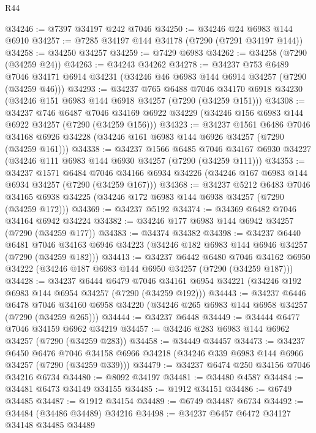 \begin{lexlean}{R44}
\begin{coremodule}
{@34246 := @7397 @34197 @242 @7046
@34250 := @34246 @24 @6983 @144 @6910
@34257 := @7285 @34197 @144 @34178 (@7290 (@7291 @34197 @144))
@34258 := @34250 @34257
@34259 := @7429 @6983
@34262 := @34258 (@7290 (@34259 @24))
@34263 := @34243 @34262
@34278 := @34237
    @753
    @6489
    @7046
    @34171
    @6914
    @34231
    (@34246 @46 @6983 @144 @6914 @34257 (@7290 (@34259 @46)))
@34293 := @34237
    @765
    @6488
    @7046
    @34170
    @6918
    @34230
    (@34246 @151 @6983 @144 @6918 @34257 (@7290 (@34259 @151)))
@34308 := @34237
    @746
    @6487
    @7046
    @34169
    @6922
    @34229
    (@34246 @156 @6983 @144 @6922 @34257 (@7290 (@34259 @156)))
@34323 := @34237
    @1561
    @6486
    @7046
    @34168
    @6926
    @34228
    (@34246 @161 @6983 @144 @6926 @34257 (@7290 (@34259 @161)))
@34338 := @34237
    @1566
    @6485
    @7046
    @34167
    @6930
    @34227
    (@34246 @111 @6983 @144 @6930 @34257 (@7290 (@34259 @111)))
@34353 := @34237
    @1571
    @6484
    @7046
    @34166
    @6934
    @34226
    (@34246 @167 @6983 @144 @6934 @34257 (@7290 (@34259 @167)))
@34368 := @34237
    @5212
    @6483
    @7046
    @34165
    @6938
    @34225
    (@34246 @172 @6983 @144 @6938 @34257 (@7290 (@34259 @172)))
@34369 := @34237 @5192
@34374 := @34369 @6482 @7046 @34164 @6942 @34224
@34382 := @34246 @177 @6983 @144 @6942 @34257 (@7290 (@34259 @177))
@34383 := @34374 @34382
@34398 := @34237
    @6440
    @6481
    @7046
    @34163
    @6946
    @34223
    (@34246 @182 @6983 @144 @6946 @34257 (@7290 (@34259 @182)))
@34413 := @34237
    @6442
    @6480
    @7046
    @34162
    @6950
    @34222
    (@34246 @187 @6983 @144 @6950 @34257 (@7290 (@34259 @187)))
@34428 := @34237
    @6444
    @6479
    @7046
    @34161
    @6954
    @34221
    (@34246 @192 @6983 @144 @6954 @34257 (@7290 (@34259 @192)))
@34443 := @34237
    @6446
    @6478
    @7046
    @34160
    @6958
    @34220
    (@34246 @265 @6983 @144 @6958 @34257 (@7290 (@34259 @265)))
@34444 := @34237 @6448
@34449 := @34444 @6477 @7046 @34159 @6962 @34219
@34457 := @34246 @283 @6983 @144 @6962 @34257 (@7290 (@34259 @283))
@34458 := @34449 @34457
@34473 := @34237
    @6450
    @6476
    @7046
    @34158
    @6966
    @34218
    (@34246 @339 @6983 @144 @6966 @34257 (@7290 (@34259 @339)))
@34479 := @34237 @6474 @250 @34156 @7046 @34216 @6734
@34480 := @8092 @34197
@34481 := @34480 @4587
@34484 := @34481 @6473 @34149 @34155
@34485 := @1912 @34151
@34486 := @6749 @34485
@34487 := @1912 @34154
@34489 := @6749 @34487 @6734
@34492 := @34484 (@34486 @34489) @34216
@34498 := @34237 @6457 @6472 @34127 @34148 @34485 @34489
}
\end{coremodule}
\end{lexlean}
